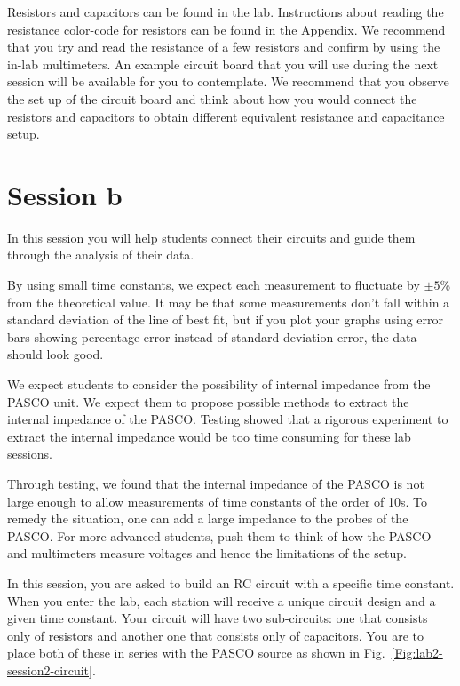 \documentclass[12pt]{report}
\begin{document}
Resistors and capacitors can be found in the lab. Instructions about reading the resistance color-code for resistors can be found in the Appendix.
We recommend that you try and read the resistance of a few resistors and confirm by using the in-lab multimeters. 
An example circuit board that you will use during the next session will be available for you to contemplate. 
We recommend that you observe the set up of the circuit board and think about how you would connect the resistors and capacitors to obtain different equivalent resistance and capacitance setup.

\section{Session b}
\begin{tcolorbox}[title=Session \#2]
In this session you will help students connect their circuits and guide them through the analysis of their data.
\end{tcolorbox}
\begin{tcolorbox}
By using small time constants, we expect each measurement to fluctuate by $\pm 5$\% from the theoretical value. It may be that some  measurements don't fall within a standard deviation of the line of best fit, but if you plot your graphs using error bars showing percentage error instead of standard deviation error, the data should look good.
\end{tcolorbox}
\begin{tcolorbox}
We expect students to consider the possibility of internal impedance from the PASCO unit. We expect them to propose possible methods to extract the internal impedance of the PASCO. Testing showed that a rigorous experiment to extract the internal impedance would be too time consuming for these lab sessions.
\end{tcolorbox}
\begin{tcolorbox}
Through testing, we found that the internal impedance of the PASCO is not large enough to allow measurements of time constants of the order of 10s. To remedy the situation, one can add a large impedance to the probes of the PASCO. For more advanced students, push them to think of how the PASCO and multimeters measure voltages and hence the limitations of the setup.
\end{tcolorbox}

In this session, you are asked to build an RC circuit with a specific time constant. When you enter the lab, each station will receive a unique circuit design and a given time constant. 
Your circuit will have two sub-circuits: one that consists only of resistors and another one that consists only of capacitors. 
You are to place both of these in series with the PASCO source as shown in Fig.~\ref{Fig:lab2-session2-circuit}.
\end{document}
